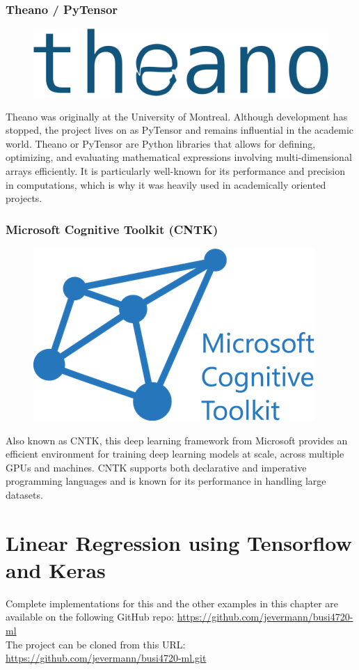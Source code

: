 \subsubsection*{Theano / PyTensor}

\begin{figure}
\begin{center}
\includegraphics[width=.75in]{theano_logo.png}
\end{center}
\end{figure}

Theano was originally at the University of Montreal. Although development has stopped, the project lives on as PyTensor and remains influential in the academic world. Theano or PyTensor are Python libraries that allows for defining, optimizing, and evaluating mathematical expressions involving multi-dimensional arrays efficiently. It is particularly well-known for its performance and precision in computations, which is why it was heavily used in academically oriented projects.

\subsubsection*{Microsoft Cognitive Toolkit (CNTK)}

\begin{figure}
\begin{center}
\includegraphics[width=.75in]{cntk_logo.png}
\end{center}
\end{figure}

Also known as CNTK, this deep learning framework from Microsoft provides an efficient environment for training deep learning models at scale, across multiple GPUs and machines. CNTK supports both declarative and imperative programming languages and is known for its performance in handling large datasets.

\section{Linear Regression using Tensorflow and Keras}

\begin{tcolorbox}[colback=alert]
\footnotesize
Complete implementations for this and the other examples in this chapter are available on the following GitHub repo:
\url{https://github.com/jevermann/busi4720-ml} \\

The project can be cloned from this URL:
\url{https://github.com/jevermann/busi4720-ml.git}
\normalsize
\end{tcolorbox}

